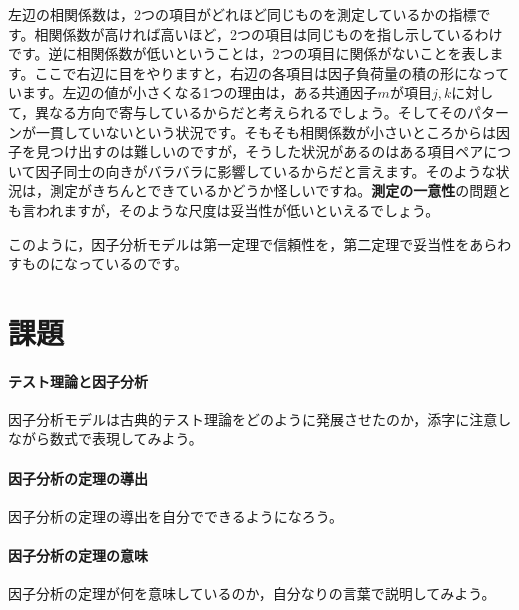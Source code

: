 \documentclass{ltjsbook}
\begin{document}
左辺の相関係数は，2つの項目がどれほど同じものを測定しているかの指標です。相関係数が高ければ高いほど，2つの項目は同じものを指し示しているわけです。逆に相関係数が低いということは，2つの項目に関係がないことを表します。ここで右辺に目をやりますと，右辺の各項目は因子負荷量の積の形になっています。左辺の値が小さくなる1つの理由は，ある共通因子$m$が項目$j,k$に対して，異なる方向で寄与しているからだと考えられるでしょう。そしてそのパターンが一貫していないという状況です。そもそも相関係数が小さいところからは因子を見つけ出すのは難しいのですが，そうした状況があるのはある項目ペアについて因子同士の向きがバラバラに影響しているからだと言えます。そのような状況は，測定がきちんとできているかどうか怪しいですね。\textbf{測定の一意性}の問題とも言われますが，そのような尺度は妥当性が低いといえるでしょう。

このように，因子分析モデルは第一定理で信頼性を，第二定理で妥当性をあらわすものになっているのです。

\section{課題}
\paragraph{テスト理論と因子分析} 因子分析モデルは古典的テスト理論をどのように発展させたのか，添字に注意しながら数式で表現してみよう。
\paragraph{因子分析の定理の導出} 因子分析の定理の導出を自分でできるようになろう。
\paragraph{因子分析の定理の意味} 因子分析の定理が何を意味しているのか，自分なりの言葉で説明してみよう。
\end{document}
